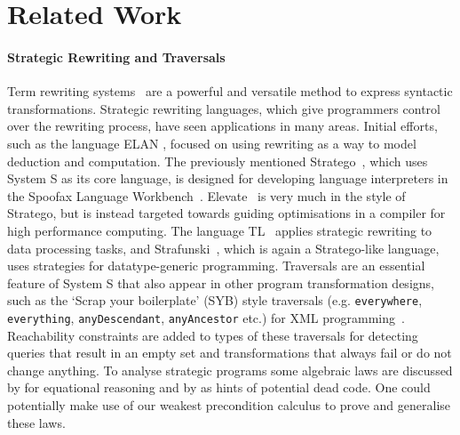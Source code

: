 \section{Related Work}
\label{related-work}
\paragraph*{Strategic Rewriting and Traversals}
Term rewriting systems~\citep{DBLP:journals/iandc/Dershowitz85} are a powerful and versatile method to express syntactic transformations. Strategic rewriting languages, which give programmers control over the rewriting process, have seen applications in many areas. Initial efforts, such as the language ELAN \citep{DBLP:journals/entcs/BorovanskyKKMV96}, focused on using rewriting as a way to model deduction and computation. The previously mentioned Stratego~\citep{DBLP:conf/icfp/VisserBT98,10.1007/3-540-45127-7_27, DBLP:journals/scp/BravenboerKVV08}, which uses System S as its core language, is designed for developing language interpreters in the Spoofax Language Workbench~\citep{DBLP:journals/software/WachsmuthKV14}.
Elevate~\citep{DBLP:journals/cacm/HagedornLKQGS23,DBLP:journals/pacmpl/HagedornLKQGS20} is very much in the style of Stratego, but is instead targeted towards guiding optimisations in a compiler for high performance computing. The language TL~\citep{DBLP:journals/scp/WinterS04} applies strategic rewriting to data processing tasks, and Strafunski~\citep{DBLP:conf/rule/LammelV02}, which is again a Stratego-like language, uses strategies for datatype-generic programming. Traversals are an essential feature of System S that also appear in other program transformation designs, such as the `Scrap your boilerplate' (SYB) style traversals (e.g. \texttt{everywhere}, \texttt{everything}, \texttt{anyDescendant}, \texttt{anyAncestor} etc.) for XML programming~\citep{10.1145/1190216.1190240}. Reachability constraints are added to types of these traversals for detecting queries that result in an empty set and transformations that always fail or do not change anything. To analyse strategic programs some algebraic laws are discussed by \citet{10.1145/1244381.1244385} for equational reasoning and by \citet{lammel2013programming} as hints of potential dead code. One could potentially make use of our weakest precondition calculus to prove and generalise these laws.

